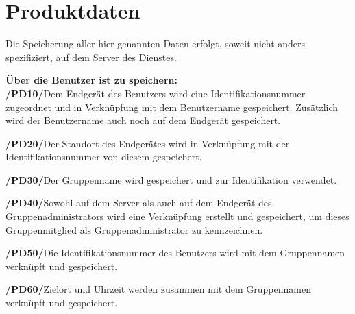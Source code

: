 \section{Produktdaten}

Die Speicherung aller hier genannten Daten erfolgt, soweit nicht anders spezifiziert, auf dem Server des Dienstes.

\textbf{Über die Benutzer ist zu speichern:}\\

\textbf{/PD10/}Dem Endgerät des Benutzers wird eine Identifikationsnummer zugeordnet und in Verknüpfung mit dem Benutzername gespeichert. Zusätzlich wird der
 Benutzername auch noch auf dem Endgerät gespeichert.

\textbf{/PD20/}Der Standort des Endgerätes wird in Verknüpfung mit der Identifikationsnummer von diesem gespeichert.

\textbf{/PD30/}Der Gruppenname wird gespeichert und zur Identifikation verwendet.

\textbf{/PD40/}Sowohl auf dem Server als auch auf dem Endgerät des Gruppenadministrators wird eine Verknüpfung erstellt und gespeichert, um dieses Gruppenmitglied als Gruppenadministrator zu kennzeichnen.

\textbf{/PD50/}Die Identifikationsnummer des Benutzers wird mit dem Gruppennamen verknüpft und gespeichert.

\textbf{/PD60/}Zielort und Uhrzeit werden zusammen mit dem Gruppennamen verknüpft und gespeichert.
